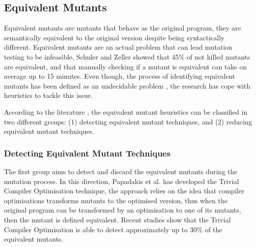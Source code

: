 
\subsection{Equivalent Mutants}
\label{sec:opt:equivalent}

Equivalent mutants are mutants that behave as the original program, they are semantically equivalent to the original version despite being syntactically different. Equivalent mutants are an actual problem that can lead mutation testing to be infeasible, Schuler and Zeller \cite{schuler2013covering} showed that 45\% of not killed mutants are equivalent, and that manually checking if a mutant is equivalent can take on average up to 15 minutes. Even though, the process of identifying equivalent mutants has been defined as an undecidable problem \cite{madeyski2013overcoming}, the research has cope with heuristics to tackle this issue.

According to the literature \cite{madeyski2013overcoming}, the equivalent mutant heuristics can be classified in two different groups: (1) detecting equivalent mutant techniques, and (2) reducing equivalent mutant techniques.

\subsubsection{Detecting Equivalent Mutant Techniques}

The first group aims to detect and discard the equivalent mutants during the mutation process. In this direction, Papadakis et al. \cite{papadakis2015trivial, kintis2017detecting,papadakis2019mutation} has developed the Trivial Compiler Optimisation technique, the approach relies on the idea that compiler optimisations transforms mutants to the optimised version, thus when the original program can be transformed by an optimisation to one of its mutants, then the mutant is defined equivalent.
Recent studies \cite{papadakis2015trivial} show that the Trivial Compiler Optimisation is able to detect approximately up to 30\% of the equivalent mutants.

